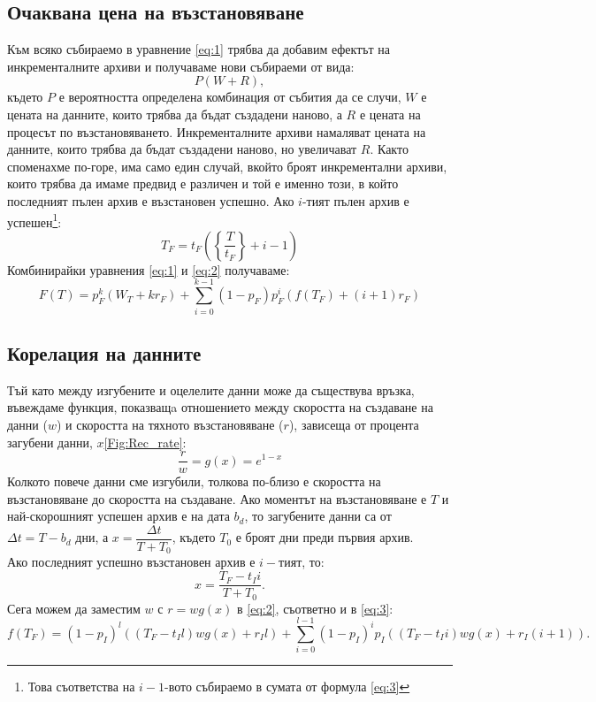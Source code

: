 \documentclass[11pt, a4paper]{article}
\theoremstyle{definition}
\begin{document}
			\subsection{Очаквана цена на възстановяване}
				Към всяко събираемо в уравнение \ref{eq:1} трябва да добавим ефектът на инкременталните архиви и получаваме нови събираеми от вида:
				$$
				P(W + R),
				$$
				където $P$ е вероятността определена комбинация от събития да се случи, $W$ е цената на данните, които трябва да бъдат създадени наново, а $R$ е цената на процесът по възстановяването. Инкременталните архиви намаляват цената на данните, които трябва да бъдат създадени наново, но увеличават $R$. Както споменахме по-горе, има само един случай, вкойто броят инкрементални архиви, които трябва да имаме предвид е различен и той е именно този, в който последният пълен архив е възстановен успешно. Ако $i$-тият пълен архив е успешен\footnote{Това съответства на $i-1$-вото събираемо в сумата от формула \ref{eq:3}}:
				$$
				T_F=t_F\left(\left\{ \frac{T}{t_F} \right\} + i - 1\right)
				$$
				Комбинирайки уравнения \ref{eq:1} и \ref{eq:2} получаваме:
				\begin{equation}\label{eq:3}
				F(T) = p_F^{k}(W_T+kr_F) + \displaystyle\sum_{i=0}^{k-1}(1-p_F)p_F^{i}\left(f(T_F) + (i+1)r_F\right)
				\end{equation}
			\subsection{Корелация на данните}
				Тъй като между изгубените и оцелелите данни може да съществува връзка, въвеждаме функция, показващa отношението между скоростта на създаване на данни ($w$) и скоростта на тяхното възстановяване ($r$), зависеща от процента загубени данни, $x$\ref{Fig:Rec_rate}:
				$$
				\dfrac{r}{w} = g(x) = e^{1-x}
				$$
				Колкото повече данни сме изгубили, толкова по-близо е скоростта на възстановяване до скоростта на създаване. Ако моментът на възстановяване е $T$ и най-скорошният успешен архив е на дата $b_d$, то загубените данни са от $\Delta t = T - b_d$ дни, а $x = \dfrac{\Delta t}{T + T_0}$, където $T_0$ е броят дни преди първия архив.\\
				Ако последният успешно възстановен архив е $i-$тият, то:
				$$x = \dfrac{T_F-t_Ii}{T + T_0}.$$
				Сега можем да заместим $w$ с $r=wg(x)$ в \ref{eq:2}, съответно и в \ref{eq:3}:
				\begin{equation}
				\label{eq:4}
				f(T_F) = (1-p_I)^l((T_F-t_Il)wg(x) + r_Il) + \displaystyle \sum_{i=0}^{l-1} (1-p_I)^{i}p_I((T_F-t_Ii)wg(x) + r_I(i+1)).
				\end{equation}
				
\end{document}
